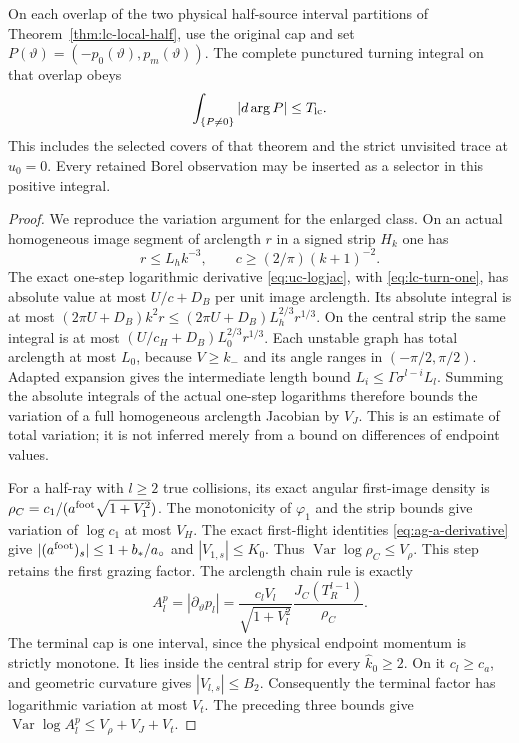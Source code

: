 \begin{lemma}
\label{lem:lc-turning}
On each overlap of the two physical half-source interval partitions
of Theorem~\ref{thm:lc-local-half}, use the original cap and set
$P(\vartheta)=(-p_0(\vartheta),p_m(\vartheta))$.  The complete
punctured turning integral on that overlap obeys
\begin{equation}\label{eq:lc-turning}
                  \int_{\{P\ne0\}}|d\arg P|\le T_{\rm lc}.
\end{equation}
This includes the selected covers of that theorem and the strict
unvisited trace at $u_0=0$.  Every retained Borel observation may be
inserted as a selector in this positive integral.
\end{lemma}
\begin{proof}
We reproduce the variation argument for the enlarged class.  On an
actual homogeneous image segment of arclength $r$ in a signed strip
$H_k$ one has
\[
 r\le L_h k^{-3},\qquad c\ge (2/\pi)(k+1)^{-2}.
\]
The exact one-step logarithmic derivative \eqref{eq:uc-logjac}, with
\eqref{eq:lc-turn-one}, has absolute value at most $U/c+D_B$ per
unit image arclength.  Its absolute integral is at most
$(2\pi U+D_B)k^2r\le(2\pi U+D_B)L_h^{2/3}r^{1/3}$.
On the central strip the same integral is at most
$(U/c_H+D_B)L_0^{2/3}r^{1/3}$.  Each unstable graph has total
arclength at most $L_0$, because $V\ge k_-$ and its angle ranges
in $(-\pi/2,\pi/2)$.  Adapted expansion gives the intermediate
length bound $L_i\le\Gamma\sigma^{l-i}L_l$.  Summing the absolute
integrals of the actual one-step logarithms therefore bounds the
variation of a full homogeneous arclength Jacobian by $V_J$.
This is an estimate of total variation; it is not inferred merely
from a bound on differences of endpoint values.

For a half-ray with $l\ge2$ true collisions, its exact angular
first-image density is
$\rho_C=c_1/(a^{\rm foot}\sqrt{1+V_1^2})$.
The monotonicity of $\varphi_1$ and the strip bounds give variation
of $\log c_1$ at most $V_H$.  The exact first-flight identities
\eqref{eq:ag-a-derivative} give
$|(a^{\rm foot})_s|\le1+b_*/a_\circ$ and
$|V_{1,s}|\le K_0$.  Thus
$\operatorname{Var}\log\rho_C\le V_\rho$.  This step retains the
first grazing factor.  The arclength chain rule is exactly
\[
 A_l^p=|\partial_\vartheta p_l|
   =\frac{c_lV_l}{\sqrt{1+V_l^2}}
                   \frac{J_C(T_R^{l-1})}{\rho_C}.
\]
The terminal cap is one interval, since the physical endpoint
momentum is strictly monotone.  It lies inside the central strip
for every $\widehat k_0\ge2$.  On it $c_l\ge c_a$, and geometric
curvature gives $|V_{l,s}|\le B_2$.  Consequently the terminal
factor has logarithmic variation at most $V_t$.  The preceding
three bounds give
$\operatorname{Var}\log A_l^p\le V_\rho+V_J+V_t$.


\end{proof}
